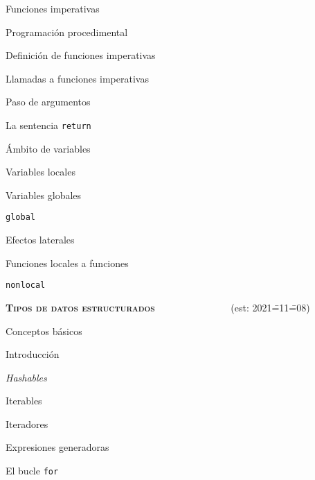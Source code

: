 \begin{longenum}
\begin{longenum}
        \item Funciones imperativas
        \begin{longenum}
            \item Programación procedimental
            \item Definición de funciones imperativas
            \item Llamadas a funciones imperativas
            \item Paso de argumentos
            \item La sentencia \texttt{return}
            \item Ámbito de variables
            \begin{longenum}
                \item Variables locales
                \item Variables globales
                \begin{longenum}
                    \item \texttt{global}
                    \item Efectos laterales
                \end{longenum}
            \end{longenum}
            \item Funciones locales a funciones
            \begin{longenum}
                \item \texttt{nonlocal}
            \end{longenum}
        \end{longenum}
    \end{longenum}
    \item \textbf{\textsc{Tipos de datos estructurados}} \ \ \ \ \ \ \ \ \ \ \ \ \ \ \ (est: 2021\==11\==08)
    \begin{longenum}
        \item Conceptos básicos
        \begin{longenum}
            \item Introducción
            \item \textit{Hashables}
            \item Iterables
            \item Iteradores
            \begin{longenum}
                \item Expresiones generadoras
                \item El bucle \texttt{for}

\end{longenum}
\end{longenum}
\end{longenum}
\end{longenum}
